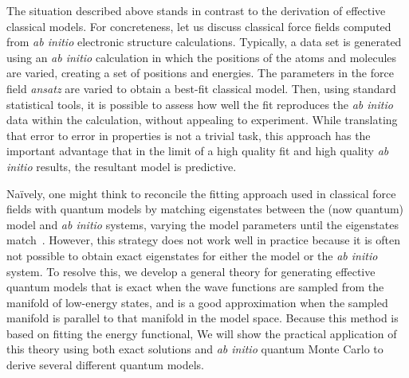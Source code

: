 The situation described above stands in contrast to the derivation of effective classical models. 
For concreteness, let us discuss classical force fields computed from {\it ab initio} electronic structure calculations. 
Typically, a data set is generated using an {\it ab initio} calculation in which the positions of the atoms and molecules are varied, creating a set of positions and energies. 
The parameters in the force field {\it ansatz} are varied to obtain a best-fit classical model.
Then, using standard statistical tools, it is possible to assess how well the fit reproduces the {\it ab initio} data within the calculation, without appealing to experiment. 
While translating that error to error in properties is not a trivial task, this approach has the important advantage that in the limit of a high quality fit and high quality {\it ab initio} results, the resultant model is predictive.

Na\"ively, one might think to reconcile the fitting approach used in classical force fields with quantum models by matching eigenstates between the (now quantum)  model and {\it ab initio} systems, varying the model parameters until the eigenstates match~\cite{Wagner2013}. 
However, this strategy does not work well in practice because it is often not possible to obtain exact eigenstates for either the model or the {\it ab initio} system.
To resolve this, we develop a general theory for generating effective quantum models that is exact when the wave functions are sampled from the manifold of low-energy states, and is a good approximation when the sampled manifold is parallel to that manifold in the model space. 
Because this method is based on fitting the energy functional, 
We will show the practical application of this theory using both exact solutions and {\it ab initio} quantum Monte Carlo to derive several different quantum models.

